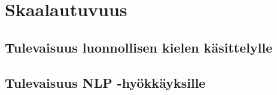 \chapter{Skaalautuvuus\label{discussion}}
\section{Tulevaisuus luonnollisen kielen käsittelylle}
\section{Tulevaisuus NLP -hyökkäyksille}